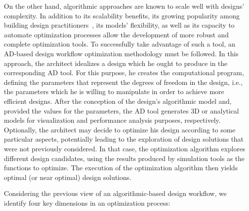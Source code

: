 	On the other hand, algorithmic approaches are known to scale well with designs' complexity. In addition to its scalability benefits, its growing popularity among building design practitioners~\cite{Kestelier2013}, its models' flexibility, as well as its capacity to automate optimization processes allow the development of more robust and complete optimization tools. To successfully take advantage of such a tool, an \ac{AD}-based design workflow optimization methodology must be followed. In this approach, the architect idealizes a design which he ought to produce in the corresponding \ac{AD} tool. For this purpose, he creates the computational program, defining the parameters that represent the degrees of freedom in the design, i.e., the parameters which he is willing to manipulate in order to achieve more efficient designs. After the conception of the design's algorithmic model and, provided the values for the parameters, the \ac{AD} tool generates 3D or analytical models for visualization and performance analysis purposes, respectively. Optionally, the architect may decide to optimize his design according to some particular aspects, potentially leading to the exploration of design solutions that were not previously considered. In that case, the optimization algorithm explores different design candidates, using the results produced by simulation tools as the functions to optimize. The execution of the optimization algorithm then yields optimal (or near optimal) design solutions.
	
	Considering the previous view of an algorithmic-based design workflow, we identify four key dimensions in an optimization process:
	
